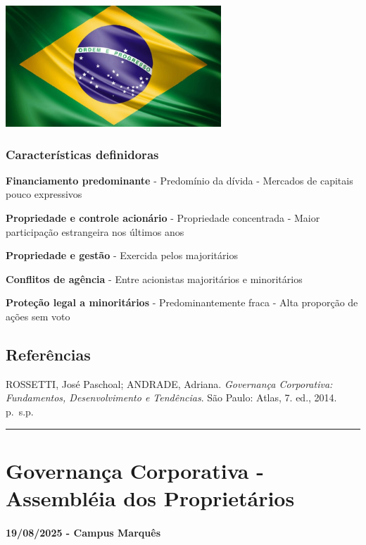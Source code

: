 \documentclass[
]{book}
\begin{document}
\includegraphics[width=3.1875in,height=\textheight]{images/02-2025-08-12_13/10-modelo_latino_americano.jpg}

\subsection{Características definidoras}\label{caracteruxedsticas-definidoras-4}

\textbf{Financiamento predominante} - Predomínio da dívida - Mercados de capitais pouco expressivos

\textbf{Propriedade e controle acionário} - Propriedade concentrada - Maior participação estrangeira nos últimos anos

\textbf{Propriedade e gestão} - Exercida pelos majoritários

\textbf{Conflitos de agência} - Entre acionistas majoritários e minoritários

\textbf{Proteção legal a minoritários} - Predominantemente fraca - Alta proporção de ações sem voto

\section{Referências}\label{referuxeancias}

ROSSETTI, José Paschoal; ANDRADE, Adriana. \emph{Governança Corporativa: Fundamentos, Desenvolvimento e Tendências}. São Paulo: Atlas, 7. ed., 2014. p.~s.p.

\begin{center}\rule{0.5\linewidth}{0.5pt}\end{center}

\chapter{Governança Corporativa - Assembléia dos Proprietários}\label{governanuxe7a-corporativa---assembluxe9ia-dos-proprietuxe1rios}

\subsubsection*{19/08/2025 - Campus Marquês}\label{campus-marquuxeas-2}
\end{document}
